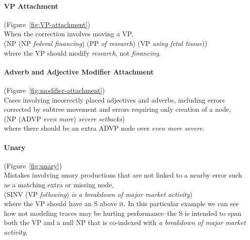 \begin{figure}
\centering

\end{figure}

\paragraph{VP Attachment} (Figure~\ref{fig:VP-attachment}) \\
When the correction involves moving a VP, \myeg \\
(NP (NP \emph{federal financing}) (PP \emph{of research}) (VP \emph{using fetal tissue})) \\
where the VP should modify \emph{research}, not \emph{financing}.

\paragraph{Adverb and Adjective Modifier Attachment} (Figure~\ref{fig:modifier-attachment}) \\
Cases involving incorrectly placed adjectives and adverbs, including errors corrected by subtree movement and errors requiring only creation of a node, \myeg \\
(NP (ADVP \emph{even more}) \emph{severe setbacks}) \\
where there should be an extra ADVP node over \emph{even more severe}.

\paragraph{Unary} (Figure~\ref{fig:unary}) \\
Mistakes involving unary productions that are not linked to a nearby error such as a matching extra or missing node, \myeg \\
(SINV (VP \emph{following}) \emph{is a breakdown of major market activity}) \\
where the VP should have an S above it.
In this particular example we can see how not modeling traces may be hurting performance--the S is intended to span both the VP and a null NP that is co-indexed with \emph{a breakdown of major market activity}.

\begin{landscape}
\begin{figure}
\centering
\begin{minipage}[b]{3in}

\end{minipage}\hfill
\begin{minipage}[b]{5in}
\centering

\end{minipage}
\end{figure}
\end{landscape}

